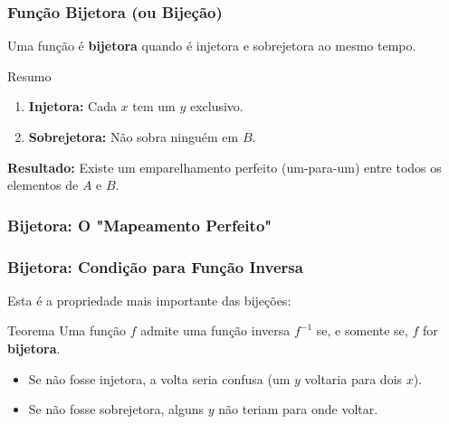 \documentclass[9pt]{beamer}
\begin{document}
\begin{frame}
\frametitle{Função Bijetora (ou Bijeção)}
Uma função é \textbf{bijetora} quando é injetora e sobrejetora ao mesmo tempo.

\begin{block}{Resumo}
\begin{enumerate}
    \item \textbf{Injetora:} Cada $x$ tem um $y$ exclusivo.
    \item \textbf{Sobrejetora:} Não sobra ninguém em $B$.
\end{enumerate}
\end{block}

\textbf{Resultado:} Existe um emparelhamento perfeito (um-para-um) entre todos os elementos de $A$ e $B$.
\end{frame}

\begin{frame}
\frametitle{Bijetora: O "Mapeamento Perfeito"}
\centering
{}
\end{frame}

\begin{frame}
\frametitle{Bijetora: Condição para Função Inversa}
Esta é a propriedade mais importante das bijeções:

\begin{alertblock}{Teorema}
Uma função $f$ admite uma função inversa $f^{-1}$ se, e somente se, $f$ for \textbf{bijetora}.
\end{alertblock}

\begin{itemize}
    \item Se não fosse injetora, a volta seria confusa (um $y$ voltaria para dois $x$).
    \item Se não fosse sobrejetora, alguns $y$ não teriam para onde voltar.
\end{itemize}
\end{frame}
\end{document}
